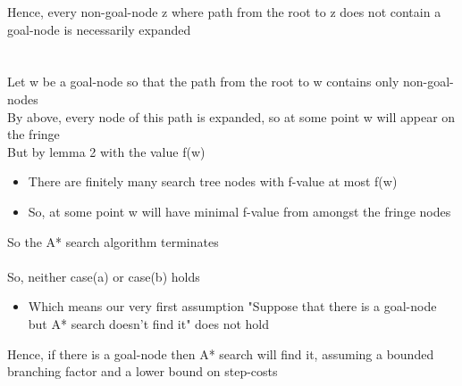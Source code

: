 \documentclass{article}[18pt]
\begin{document}
Hence, every non-goal-node z where path from the root to z does not contain a goal-node is necessarily expanded\\
\\
\\
Let w be a goal-node so that the path from the root to w contains only non-goal-nodes\\
By above, every node of this path is expanded, so at some point w will appear on the fringe\\
But by lemma 2 with the value f(w)
\begin{itemize}
	\item There are finitely many search tree nodes with f-value at most f(w)
	\item So, at some point w will have minimal f-value from amongst the fringe nodes
\end{itemize}
So the A* search algorithm terminates\\
\\
So, neither case(a) or case(b) holds
\begin{itemize}
	\item Which means our very first assumption "Suppose that there is a goal-node but A* search doesn't find it" does not hold
\end{itemize}
Hence, if there is a goal-node then A* search will find it, assuming a bounded branching factor and a lower bound on step-costs
\end{document}
